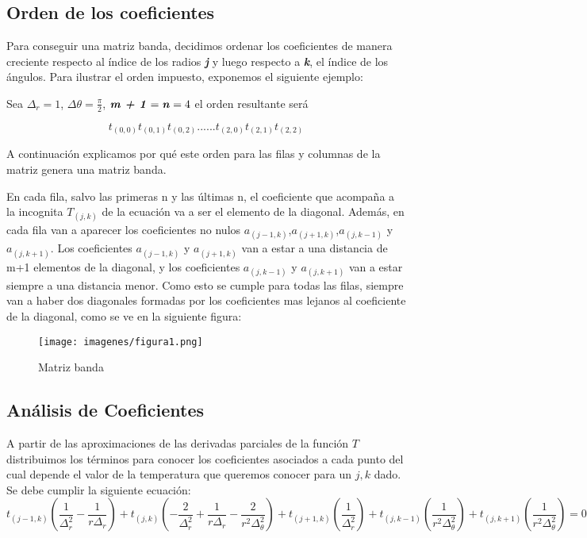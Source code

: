 
\subsection{Orden de los coeficientes}


Para conseguir una matriz banda, decidimos ordenar los coeficientes de manera creciente respecto al índice de los radios \textbf{\textit{j}} y luego respecto a \textbf{\textit{k}}, el índice de los ángulos. Para ilustrar el orden impuesto, exponemos el siguiente ejemplo:

Sea $\Delta_{r} = 1$,  $\Delta{\theta} = \frac{\pi}{2}$, $\textbf{\textit{m + 1}} = \textbf{\textit{n}} = 4$ el orden resultante será 

$$ t_{(0,0)} t_{(0,1)} t_{(0,2)} ...... t_{(2,0)} t_{(2,1)} t_{(2,2)} $$


A continuación explicamos por qué este orden para las filas y columnas de la matriz genera una matriz banda.

En cada fila, salvo las primeras n y las últimas n, el coeficiente que acompaña a la incognita $T_{(j,k)}$ de la ecuación va a ser el elemento de la diagonal. Además, en cada fila van a aparecer los coeficientes no nulos $a_{(j-1,k)}$,$a_{(j+1,k)}$,$a_{(j,k-1)}$ y $a_{(j,k+1)}$.
Los coeficientes $a_{(j-1,k)}$ y $a_{(j+1,k)}$ van a estar a una distancia de m+1 elementos de la diagonal, y los coeficientes $a_{(j,k-1)}$ y $a_{(j,k+1)}$ van a estar siempre a una distancia menor. Como esto se cumple para todas las filas, siempre van a haber dos diagonales formadas por los coeficientes mas lejanos al coeficiente de la diagonal, como se ve en la siguiente figura:

\begin{figure}[h]
  \texttt{[image: imagenes/figura1.png]}
  \caption{Matriz banda}
  \label{fig:corteHorno}
\end{figure}

\newpage
\subsection{Análisis de Coeficientes}
A partir de las aproximaciones de las derivadas parciales de la función $T$ distribuimos los términos para conocer los coeficientes asociados a cada punto del cual depende el valor de la temperatura que queremos conocer para un $j,k$ dado. Se debe cumplir la siguiente ecuación: \\
$$t_{(j-1, k)} (\frac{1}{\Delta^2_r}-\frac{1}{r \Delta_r}) +
t_{(j, k)} (-\frac{2}{\Delta^2_r}+\frac{1}{r \Delta_r}-\frac{2}{r^2 \Delta^2_\theta}) + 
t_{(j+1, k)} (\frac{1}{\Delta^2_r}) + 
t_{(j, k-1)} (\frac{1}{r^2 \Delta^2_\theta}) +
t_{(j, k+1)} (\frac{1}{r^2 \Delta^2_\theta}) = 0 $$ \\

